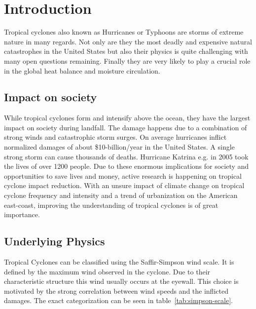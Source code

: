 \chapter{Introduction}\label{sec:introduction}
Tropical cyclones also known as Hurricanes or Typhoons are storms of extreme nature in many regards. Not only are they the most deadly and expensive natural catastrophes in the United States but also their physics is quite challenging with many open questions remaining.\cite{emanuel-summ}
Finally they are very likely to play a crucial role in the global heat balance and moisture circulation.\cite{moisture-transport}\cite{global-heat}

\section{Impact on society}\label{sec:society}
While tropical cyclones form and intensify above the ocean, they have the largest impact on society during landfall. The damage happens due to a combination of strong winds and catastrophic storm surges. On average hurricanes inflict normalized damages of about \$10-billion/year in the United States.\cite{damage-norm} A single strong storm can cause thousands of deaths. Hurricane Katrina e.g. in 2005 took the lives of over 1200 people.\cite{hurr-2005}
Due to these enormous implications for society and opportunities to save lives and money, active research is happening on tropical cyclone impact reduction. With an unsure impact of climate change on tropical cyclone frequency and intensity and a trend of urbanization on the American east-coast, improving the understanding of tropical cyclones is of great importance.

\section{Underlying Physics}\label{sec:physics}
Tropical Cyclones can be classified using the Saffir-Simpson wind scale. It is defined by the maximum wind observed in the cyclone. Due to their characteristic structure this wind usually occurs at the eyewall. This choice is motivated by the strong correlation between wind speeds and the inflicted damages.\cite{simpson} The exact categorization can be seen in table~\ref{tab:simpson-scale}.

